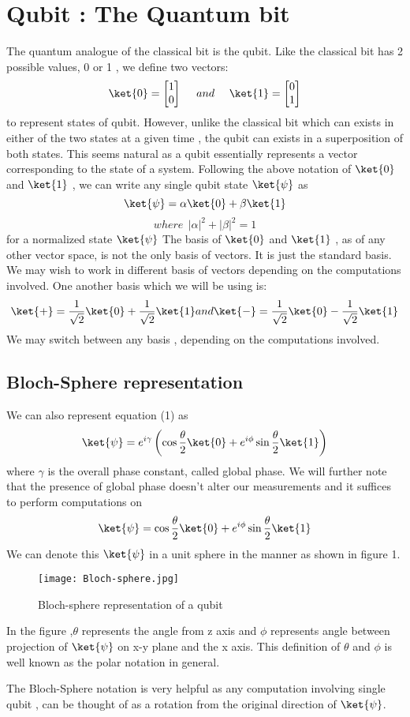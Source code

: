 \section{Qubit : The Quantum bit}
The quantum analogue of the classical bit is the qubit. Like the classical bit has 2 possible values, 0 or 1 , we define two vectors:
$$\ket{0} = \begin{bmatrix} 1\\ 0 \end{bmatrix} ~~~~and  ~~~~\ket{1} = \begin{bmatrix} 0\\ 1 \end{bmatrix} $$ 
to represent states of qubit. However, unlike the classical bit which can exists in either of the two states at a given time , the qubit can exists in a superposition of both states. This seems natural as a qubit essentially represents a vector corresponding to the  state of a system. Following the above notation of $\ket{0}$ and $\ket{1}$ , we can write any single qubit state $\ket{\psi}$ as \begin{equation} \ket{\psi} = \alpha \ket{0} + \beta \ket{1} \end{equation}
$$where  ~~|\alpha|^2 + |\beta|^2 = 1 $$ for a normalized state $\ket{\psi}$
The basis of $\ket{0} $ and $\ket{1}$ , as of any other vector space, is not the only basis of vectors. It is just the standard basis. We may wish to work in different basis of vectors depending on the computations involved. One another basis which we will be using is:
$$\ket{+} =\frac{1}{\sqrt{2}}\ket{0}+\frac{1}{
 \sqrt{2}}\ket{1} and \ket{-} = \frac{1}{\sqrt{2}}\ket{0}-\frac{1}{
 \sqrt{2}}\ket{1} $$
We may switch between any basis , depending on the computations involved.

\subsection{Bloch-Sphere representation}
We can also represent equation (1) as 
$$ \ket{\psi} = e^{i\gamma} \left(\cos{\frac{\theta}{2}}\ket{0} + e^{i\phi}\sin{\frac{\theta}{2}}\ket{1}\right) $$
where $\gamma$ is the overall phase constant, called global phase.
We will further note that the presence of global phase doesn't alter our measurements and it suffices to perform computations on 
$$ \ket{\psi}  =  \cos{\frac{\theta}{2}}\ket{0} + e^{i\phi}\sin{\frac{\theta}{2}}\ket{1}$$
We can denote this $\ket{\psi}$ in a unit sphere in the manner as shown in figure 1. \\
\begin{figure}[h!]
\centering
\texttt{[image: Bloch-sphere.jpg]}
\caption{Bloch-sphere representation of a qubit}
\end{figure}
In the figure ,$\theta $ represents the angle from z axis and $\phi$ represents angle between projection of $\ket{\psi}$ on x-y plane and the x axis. This definition of $\theta$ and $\phi$ is well known as the polar notation in general. \par
The Bloch-Sphere notation is very helpful as any computation involving single qubit , can be thought of as a rotation from the original direction of $\ket{\psi}$.

